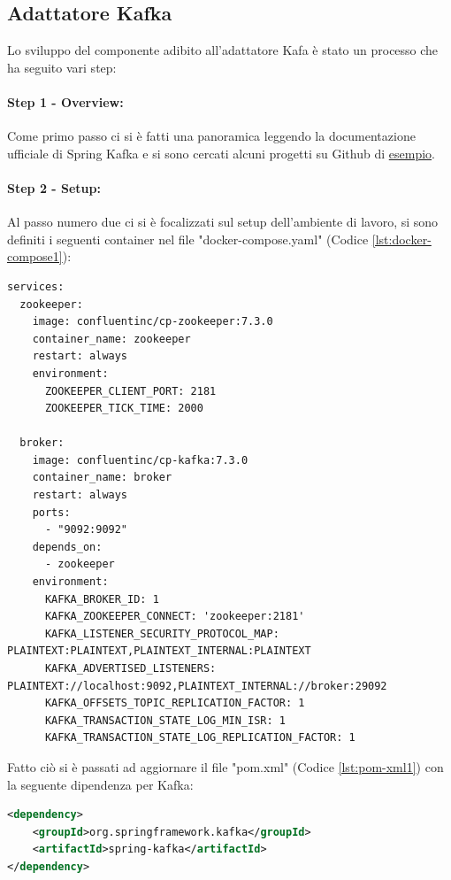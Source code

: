 
\subsection{Adattatore Kafka}
Lo sviluppo del componente adibito all'adattatore Kafa è stato un processo che ha seguito vari step:
\paragraph{Step 1 - Overview:}
Come primo passo ci si è fatti una panoramica leggendo la documentazione ufficiale di Spring Kafka \cite{SpringKafka} e si sono cercati alcuni progetti su Github di \href{https://github.com/devtiro/spring-boot-kafka-tutorial/tree/main}{esempio}.
\paragraph{Step 2 - Setup:}
Al passo numero due ci si è focalizzati sul setup dell’ambiente di lavoro, si sono definiti i seguenti container nel file "docker-compose.yaml" (Codice \vref{lst:docker-compose1}):
\begin{lstlisting}[language=docker-compose, caption={Setup del docker-compose.yaml per l'adattatore Kafka}, label=lst:docker-compose1]
services:  
  zookeeper:
    image: confluentinc/cp-zookeeper:7.3.0
    container_name: zookeeper
    restart: always
    environment:
      ZOOKEEPER_CLIENT_PORT: 2181
      ZOOKEEPER_TICK_TIME: 2000

  broker:
    image: confluentinc/cp-kafka:7.3.0
    container_name: broker
    restart: always
    ports:
      - "9092:9092"
    depends_on:
      - zookeeper
    environment:
      KAFKA_BROKER_ID: 1
      KAFKA_ZOOKEEPER_CONNECT: 'zookeeper:2181'
      KAFKA_LISTENER_SECURITY_PROTOCOL_MAP: PLAINTEXT:PLAINTEXT,PLAINTEXT_INTERNAL:PLAINTEXT
      KAFKA_ADVERTISED_LISTENERS: PLAINTEXT://localhost:9092,PLAINTEXT_INTERNAL://broker:29092
      KAFKA_OFFSETS_TOPIC_REPLICATION_FACTOR: 1
      KAFKA_TRANSACTION_STATE_LOG_MIN_ISR: 1
      KAFKA_TRANSACTION_STATE_LOG_REPLICATION_FACTOR: 1
\end{lstlisting}
Fatto ciò si è passati ad aggiornare il file "pom.xml" (Codice \vref{lst:pom-xml1}) con la seguente dipendenza per Kafka: 
\begin{lstlisting}[language=XML, caption={Aggiornamento dipendenze nel pom.xml per includere spring-kafka}, label=lst:pom-xml1]
<dependency>
    <groupId>org.springframework.kafka</groupId>
    <artifactId>spring-kafka</artifactId>
</dependency>
\end{lstlisting}
